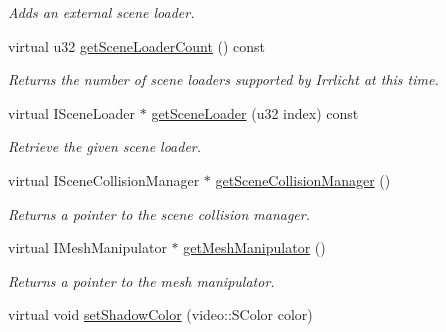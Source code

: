 \begin{DoxyCompactItemize}
\begin{DoxyCompactList}\small\item\em Adds an external scene loader. \end{DoxyCompactList}\item 
virtual u32 \hyperlink{classirr_1_1scene_1_1_c_scene_manager_a1a26bb986e97ceef455243546d1630c5}{get\-Scene\-Loader\-Count} () const 
\begin{DoxyCompactList}\small\item\em Returns the number of scene loaders supported by Irrlicht at this time. \end{DoxyCompactList}\item 
\hypertarget{classirr_1_1scene_1_1_c_scene_manager_aad1382a39355b0c5ebf90f3e6f413870}{virtual I\-Scene\-Loader $\ast$ \hyperlink{classirr_1_1scene_1_1_c_scene_manager_aad1382a39355b0c5ebf90f3e6f413870}{get\-Scene\-Loader} (u32 index) const }\label{classirr_1_1scene_1_1_c_scene_manager_aad1382a39355b0c5ebf90f3e6f413870}

\begin{DoxyCompactList}\small\item\em Retrieve the given scene loader. \end{DoxyCompactList}\item 
\hypertarget{classirr_1_1scene_1_1_c_scene_manager_a42d6ff3c718cc0cedef37a663cfc5d7f}{virtual I\-Scene\-Collision\-Manager $\ast$ \hyperlink{classirr_1_1scene_1_1_c_scene_manager_a42d6ff3c718cc0cedef37a663cfc5d7f}{get\-Scene\-Collision\-Manager} ()}\label{classirr_1_1scene_1_1_c_scene_manager_a42d6ff3c718cc0cedef37a663cfc5d7f}

\begin{DoxyCompactList}\small\item\em Returns a pointer to the scene collision manager. \end{DoxyCompactList}\item 
\hypertarget{classirr_1_1scene_1_1_c_scene_manager_a065e05b21c244d8ade0f009cd15d2710}{virtual I\-Mesh\-Manipulator $\ast$ \hyperlink{classirr_1_1scene_1_1_c_scene_manager_a065e05b21c244d8ade0f009cd15d2710}{get\-Mesh\-Manipulator} ()}\label{classirr_1_1scene_1_1_c_scene_manager_a065e05b21c244d8ade0f009cd15d2710}

\begin{DoxyCompactList}\small\item\em Returns a pointer to the mesh manipulator. \end{DoxyCompactList}\item 
\hypertarget{classirr_1_1scene_1_1_c_scene_manager_a5fbaa0689b869b296e47f09315a1e5a0}{virtual void \hyperlink{classirr_1_1scene_1_1_c_scene_manager_a5fbaa0689b869b296e47f09315a1e5a0}{set\-Shadow\-Color} (video\-::\-S\-Color color)}\label{classirr_1_1scene_1_1_c_scene_manager_a5fbaa0689b869b296e47f09315a1e5a0}


\end{DoxyCompactItemize}
